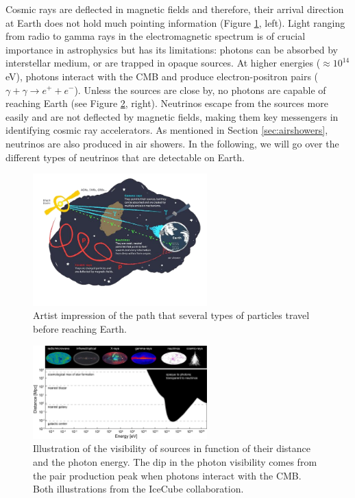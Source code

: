 Cosmic rays are deflected in magnetic fields and therefore, their arrival direction at Earth does not hold much pointing information (Figure \ref{fig:sourceinfo}, left). Light ranging from radio to gamma rays in the electromagnetic spectrum is of crucial importance in astrophysics but has its limitations: photons can be absorbed by interstellar medium, or are trapped in opaque sources. At higher energies ($\approx 10^{14}$ eV), photons interact with the CMB and produce electron-positron pairs ($\gamma + \gamma \rightarrow e^+ + e^-$). Unless the sources are close by, no photons are capable of reaching Earth (see Figure \ref{fig:opaquephotons}, right). Neutrinos escape from the sources more easily and are not deflected by magnetic fields, making them key messengers in identifying cosmic ray accelerators. As mentioned in Section \ref{sec:airshowers}, neutrinos are also produced in air showers. In the following, we will go over the different types of neutrinos that are detectable on Earth.


\begin{figure}[t]
\centering
\includegraphics[width=0.6\textwidth]{chapter3/img/sourceinformation_3.jpg}
\caption{Artist impression of the path that several types of particles travel before reaching Earth.}
\label{fig:sourceinfo}
\end{figure}

\begin{figure}[t]
\centering
\includegraphics[width=0.6\textwidth]{chapter3/img/opaque-to-photons.png}
\caption{Illustration of the visibility of sources in function of their distance and the photon energy. The dip in the photon visibility comes from the pair production peak when photons interact with the CMB. Both illustrations from the IceCube collaboration.}
\label{fig:opaquephotons}
\end{figure}

